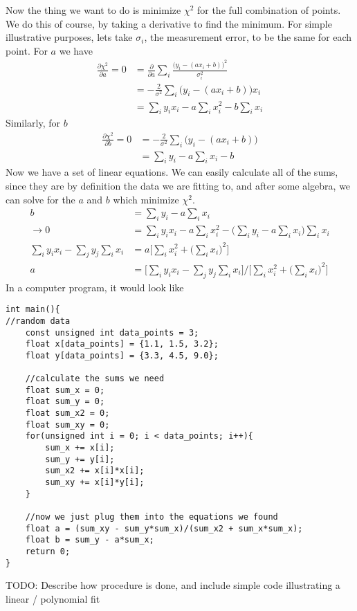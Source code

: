 Now the thing we want to do is minimize $\chi^2$ for the full combination of points. We do this of course, by taking a derivative to find the minimum. For simple illustrative purposes, lets take $\sigma_i$, the measurement error, to be the same for each point. For $a$ we have
\begin{align}
\frac{\partial \chi^2}{\partial a} = 0 &= \frac{\partial}{\partial a} \sum_i \frac{\Big(y_i - (ax_i + b)\Big)^2}{\sigma_i^2} \\
&= - \frac{2}{\sigma^2}\sum_i \Big(y_i - (ax_i+b)\Big)x_i\\
&= \sum_i y_i x_i - a\sum_ix_i^2 - b\sum_i x_i
\end{align}
Similarly, for $b$
\begin{align}
\frac{\partial \chi^2}{\partial b} = 0 &= -\frac{2}{\sigma^2}\sum_i \Big(y_i-(ax_i+b)\Big)\\
&= \sum_i y_i - a \sum_i x_i - b
\end{align}
Now we have a set of linear equations. We can easily calculate all of the sums, since they are by definition the data we are fitting to, and after some algebra, we can solve for the $a$ and $b$ which minimize $\chi^2$.
\begin{align}
b &= \sum_i y_i - a \sum_i x_i\\
\rightarrow 0 &= \sum_i y_i x_i - a\sum_ix_i^2 - \Big(\sum_i y_i - a \sum_i x_i\Big)\sum_i x_i\\
\sum_i y_i x_i  - \sum_j y_j \sum_i x_i &= a\Big[\sum_i x_i^2 +\Big(\sum_i x_i\Big)^2\Big]\\
a &= \Big[\sum_i y_i x_i  - \sum_j y_j \sum_i x_i\Big] /\Big[\sum_i x_i^2 +\Big(\sum_i x_i\Big)^2\Big] 
\end{align}
In a computer program, it would look like
\begin{verbatim}
int main(){
//random data
    const unsigned int data_points = 3;
    float x[data_points] = {1.1, 1.5, 3.2};
    float y[data_points] = {3.3, 4.5, 9.0};
    
    //calculate the sums we need
    float sum_x = 0;
    float sum_y = 0;
    float sum_x2 = 0;
    float sum_xy = 0;
    for(unsigned int i = 0; i < data_points; i++){
        sum_x += x[i];
        sum_y += y[i];
        sum_x2 += x[i]*x[i];
        sum_xy += x[i]*y[i];
    }
    
    //now we just plug them into the equations we found
    float a = (sum_xy - sum_y*sum_x)/(sum_x2 + sum_x*sum_x);
    float b = sum_y - a*sum_x;
    return 0;
}
\end{verbatim}

TODO: Describe how procedure is done, and include simple code illustrating a linear / polynomial fit


